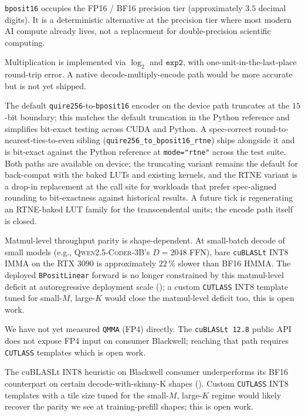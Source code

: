 \documentclass[11pt,a4paper]{article}
\newcommand{\bpsixteen}{\texttt{bposit16}}
\newcommand{\quireTSF}{\texttt{quire256}}
\begin{document}
\bpsixteen{} occupies the FP16 / BF16 precision tier (approximately
$3.5$ decimal digits). It is a deterministic alternative at the
precision tier where most modern AI compute already lives, not a
replacement for double-precision scientific computing.

Multiplication is implemented via $\log_2$ and $\texttt{exp2}$, with
one-unit-in-the-last-place round-trip error. A native
decode-multiply-encode path would be more accurate but is not yet
shipped.

The default \quireTSF{}-to-\bpsixteen{} encoder on the device path
truncates at the $15$-bit boundary; this matches the default
truncation in the Python reference and simplifies bit-exact testing
across CUDA and Python. A spec-correct round-to-nearest-ties-to-even
sibling (\texttt{quire256\_to\_bposit16\_rtne}) ships alongside it
and is bit-exact against the Python reference at
\texttt{mode="rtne"} across the test suite. Both paths are available
on device; the truncating variant remains the default for back-compat
with the baked LUTs and existing kernels, and the RTNE variant is a
drop-in replacement at the call site for workloads that prefer
spec-aligned rounding to bit-exactness against historical results.
A future tick is regenerating an RTNE-baked LUT family for the
transcendental units; the encode path itself is closed.

Matmul-level throughput parity is shape-dependent. At small-batch
decode of small models (e.g., \textsc{Qwen2.5-Coder-3B}'s $D = 2048$
FFN), bare \texttt{cuBLASLt} INT8 IMMA on the RTX 3090 is approximately
$22\,\%$ slower than BF16 HMMA. The deployed
\texttt{BPositLinear} forward is no longer constrained by this
matmul-level deficit at autoregressive deployment scale
(); a custom \texttt{CUTLASS} INT8 template tuned for
small-$M$, large-$K$ would close the matmul-level deficit too, this
is open work.

We have not yet measured \texttt{QMMA} (FP4) directly. The
\texttt{cuBLASLt 12.8} public API does not expose FP4 input on
consumer Blackwell; reaching that path requires \texttt{CUTLASS}
templates which is open work.

The cuBLASLt INT8 heuristic on Blackwell consumer underperforms its
BF16 counterpart on certain decode-with-skinny-K shapes
(). Custom \texttt{CUTLASS} INT8 templates with a
tile size tuned for the small-$M$, large-$K$ regime would likely
recover the parity we see at training-prefill shapes; this is open
work.
\end{document}
